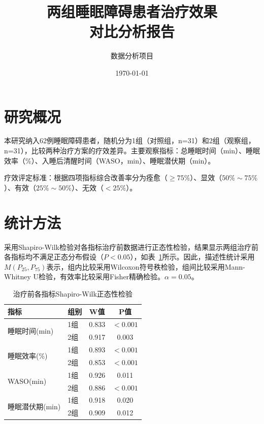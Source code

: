 \documentclass[12pt,a4paper]{article}
\title{\textbf{两组睡眠障碍患者治疗效果\\对比分析报告}}
\author{数据分析项目}
\date{\today}
\begin{document}
\maketitle
\thispagestyle{empty}
\newpage
\tableofcontents
\newpage

\section{研究概况}

本研究纳入62例睡眠障碍患者，随机分为1组（对照组，n=31）和2组（观察组，n=31），比较两种治疗方案的疗效差异。主要观察指标：总睡眠时间（min）、睡眠效率（\%）、入睡后清醒时间（WASO，min）、睡眠潜伏期（min）。

疗效评定标准：根据四项指标综合改善率分为痊愈（$\geq 75\%$）、显效（$50\%\sim 75\%$）、有效（$25\%\sim 50\%$）、无效（$< 25\%$）。

\section{统计方法}

采用Shapiro-Wilk检验对各指标治疗前数据进行正态性检验，结果显示两组治疗前各指标均不满足正态分布假设（$P<0.05$），如表~\ref{tab:shapiro}所示。因此，描述性统计采用$M(P_{25}, P_{75})$表示，组内比较采用Wilcoxon符号秩检验，组间比较采用Mann-Whitney U检验，有效率比较采用Fisher精确检验。$\alpha=0.05$。

\begin{table}[H]
\centering
\caption{治疗前各指标Shapiro-Wilk正态性检验}
\label{tab:shapiro}
\begin{tabular}{llcc}
\toprule
\textbf{指标} & \textbf{组别} & \textbf{W值} & \textbf{P值} \\
\midrule
\multirow{2}{*}{睡眠时间(min)} & 1组 & 0.833 & $<0.001$ \\
 & 2组 & 0.917 & 0.003 \\
\midrule
\multirow{2}{*}{睡眠效率(\%)} & 1组 & 0.893 & $<0.001$ \\
 & 2组 & 0.853 & $<0.001$ \\
\midrule
\multirow{2}{*}{WASO(min)} & 1组 & 0.926 & 0.011 \\
 & 2组 & 0.886 & $<0.001$ \\
\midrule
\multirow{2}{*}{睡眠潜伏期(min)} & 1组 & 0.918 & 0.020 \\
 & 2组 & 0.909 & 0.012 \\
\bottomrule
\end{tabular}
\end{table}
\end{document}
